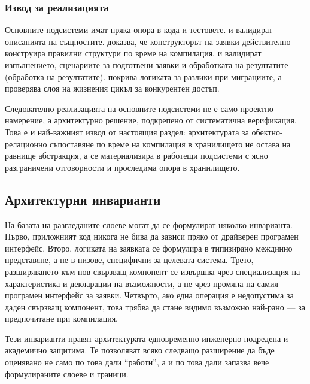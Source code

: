 \subsubsection{Извод за реализацията}

Основните подсистеми имат пряка опора в кода и тестовете.  и  валидират описанията на същностите.  доказва, че конструкторът на заявки действително конструира правилни структури по време на компилация.  и  валидират изпълнението, сценариите за подготвени заявки и обработката на резултатите (обработка на резултатите).  покрива логиката за разлики при миграциите, а  проверява слоя на жизнения цикъл за конкурентен достъп.

Следователно реализацията на основните подсистеми не е само проектно намерение, а архитектурно решение, подкрепено от систематична верификация. Това е и най-важният извод от настоящия раздел: архитектурата за обектно-релационно съпоставяне по време на компилация в хранилището не остава на равнище абстракция, а се материализира в работещи подсистеми с ясно разграничени отговорности и проследима опора в хранилището.

\subsection{Архитектурни инварианти}

На базата на разгледаните слоеве могат да се формулират няколко инварианта. Първо, приложният код никога не бива да зависи пряко от драйверен програмен интерфейс. Второ, логиката на заявката се формулира в типизирано междинно представяне, а не в низове, специфични за целевата система. Трето, разширяването към нов свързващ компонент се извършва чрез специализация на характеристика и декларации на възможности, а не чрез промяна на самия програмен интерфейс за заявки. Четвърто, ако една операция е недопустима за даден свързващ компонент, това трябва да стане видимо възможно най-рано --- за предпочитане при компилация.

Тези инварианти правят архитектурата едновременно инженерно подредена и академично защитима. Те позволяват всяко следващо разширение да бъде оценявано не само по това дали ``работи'', а и по това дали запазва вече формулираните слоеве и граници.

